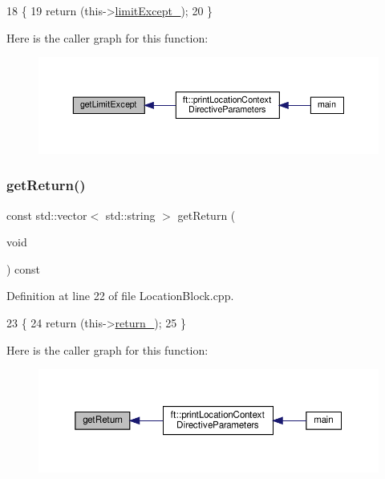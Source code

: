 \begin{DoxyCode}
18     \{
19         \textcolor{keywordflow}{return} (this->\hyperlink{classft_1_1_location_block_a8fec53119566b5654a7b902a1c53c6d9}{limitExcept\_});
20     \}
\end{DoxyCode}
Here is the caller graph for this function\+:
\nopagebreak
\begin{figure}[H]
\begin{center}
\leavevmode
\includegraphics[width=350pt]{classft_1_1_location_block_ad2dc75d3f9c9f06f31e3948823557d52_icgraph}
\end{center}
\end{figure}
\mbox{\label{classft_1_1_location_block_aeef5e4710c02406c46e54d4aa0c8f57c}} 
\subsubsection{\texorpdfstring{get\+Return()}{getReturn()}}
{\footnotesize\ttfamily const std\+::vector$<$ std\+::string $>$ get\+Return (\begin{DoxyParamCaption}\item[{void}]{ }\end{DoxyParamCaption}) const}



Definition at line 22 of file Location\+Block.\+cpp.


\begin{DoxyCode}
23     \{
24         \textcolor{keywordflow}{return} (this->\hyperlink{classft_1_1_location_block_abab721f365aff66f8a1289de21c8f01f}{return\_});
25     \}
\end{DoxyCode}
Here is the caller graph for this function\+:
\nopagebreak
\begin{figure}[H]
\begin{center}
\leavevmode
\includegraphics[width=350pt]{classft_1_1_location_block_aeef5e4710c02406c46e54d4aa0c8f57c_icgraph}
\end{center}
\end{figure}
\mbox{\label{classft_1_1_base_directives_aa5dbcb08bda0a0e7e502d2df7cf64287}} 
